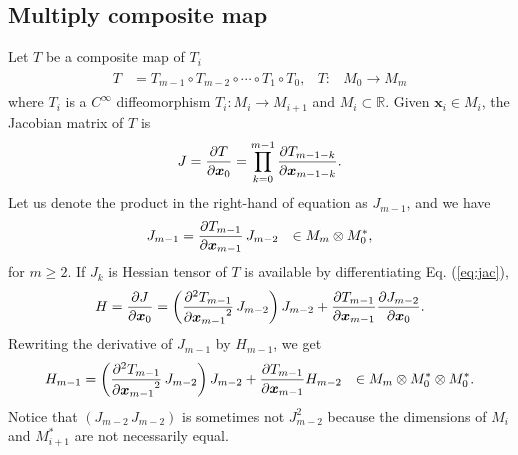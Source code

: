 \documentclass[a4paper]{article}
\newcommand{\R}{\mathbb{R}}
\newcommand{\pderiv}[3][1]{%
    \ifthenelse{\equal{#1}{1}}{\frac{\partial #2}{\partial #3}}{\frac{\partial^#1 #2}{{\partial #3}^#1}}
}
\newcommand{\jac}{J}
\newcommand{\hes}{H}
\newcommand{\parens}[1]{\left(#1\right)}
\begin{document}
\subsection{Multiply composite map}
Let $T$ be a composite map of $T_i$
\begin{align}
    \begin{aligned}
        T &= T_{m-1} \circ T_{m-2} \circ \cdots \circ T_1 \circ T_0,
        &
        T: & M_0 \to M_{m}
    \end{aligned}
    \end{align}
where $T_i$ is a $C^{\infty}$ diffeomorphism $T_i: M_i \to M_{i+1}$ and $M_i \subset \R$.
Given $\bm x_i \in M_i$, the Jacobian matrix of $T$ is
\begin{align}
    \jac = \pderiv{T}{\bm x_0} = \prod_{k=0}^{m-1} \pderiv{T_{m-1-k}}{\bm x_{m-1-k}}.
\end{align}
Let us denote the product in the right-hand of equation as $\jac_{m-1}$, and we have
\begin{align}
    \begin{aligned}
        \jac_{m-1} &= \pderiv{T_{m-1}}{\bm x_{m-1}}\, \jac_{m-2}
        & \in M_{m} \otimes M_0^*,
    \end{aligned}
    \label{eq:jac}
\end{align}
for $m \ge 2$.
If $\jac_{k}$ is
Hessian tensor of $T$ is available by differentiating Eq. (\ref{eq:jac}),
\begin{align}
    \hes = \pderiv{\jac}{\bm x_0}
    =
    \parens{
        \pderiv[2]{T_{m-1}}{\bm x_{m-1}}\,
        \jac_{m-2}
    }
    \jac_{m-2}
    +
    \pderiv{T_{m-1}}{\bm x_{m-1}}
    \pderiv{\jac_{m-2}}{\bm x_0}.
\end{align}
Rewriting the derivative of $\jac_{m-1}$ by $\hes_{m-1}$, we get
\begin{align}
    \begin{aligned}
        \hes_{m-1} &=
        \parens{
            \pderiv[2]{T_{m-1}}{\bm x_{m-1}}\,
            \jac_{m-2}
        }
        \jac_{m-2}
        +
        \pderiv{T_{m-1}}{\bm x_{m-1}}
        \hes_{m-2} & \in M_m \otimes M_0^* \otimes M_0^*
    \end{aligned}
    .\label{eq:hes}
\end{align}
Notice that $\parens{\jac_{m-2}\, \jac_{m-2}}$ is sometimes not $\jac_{m-2}^2$
because the dimensions of $M_{i}$ and $M_{i+1}^*$ are not necessarily equal.
\end{document}
